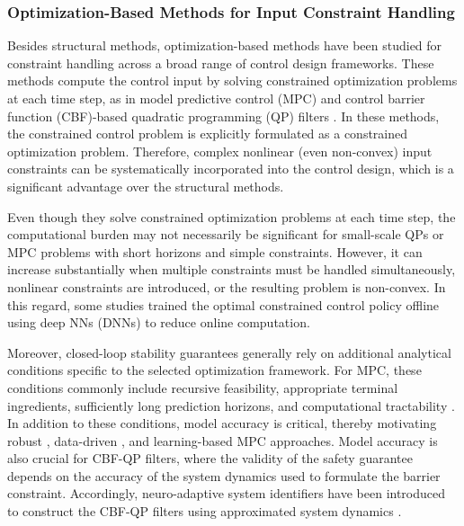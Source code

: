 \documentclass[letterpaper, journal]{IEEEtran}
\begin{document}


\subsubsection{Optimization-Based Methods for Input Constraint Handling}

Besides structural methods, optimization-based methods have been studied for constraint handling across a broad range of control design frameworks.
These methods compute the control input by solving constrained optimization problems at each time step, as in model predictive control (MPC) \cite{Vahidi-Moghaddam:2025aa,Mallick:2025aa,Khodaverdian:2025aa,Greune:2011aa,Bemporad:1999aa,Berberich:2025aa,Draeger:1995aa} and control barrier function (CBF)-based quadratic programming (QP) filters \cite{Ames:2019aa,Ko:2025aa,Sweatland:2025aa}. 
In these methods, the constrained control problem is explicitly formulated as a constrained optimization problem.
Therefore, complex nonlinear (even non-convex) input constraints can be systematically incorporated into the control design, which is a significant advantage over the structural methods.

Even though they solve constrained optimization problems at each time step, the computational burden may not necessarily be significant for small-scale QPs or MPC problems with short horizons and simple constraints.
However, it can increase substantially when multiple constraints must be handled simultaneously, nonlinear constraints are introduced, or the resulting problem is non-convex.
In this regard, some studies \cite{Vahidi-Moghaddam:2025aa,Mallick:2025aa,Khodaverdian:2025aa} trained the optimal constrained control policy offline using deep NNs (DNNs) to reduce online computation.

Moreover, closed-loop stability guarantees generally rely on additional analytical conditions specific to the selected optimization framework.
For MPC, these conditions commonly include recursive feasibility, appropriate terminal ingredients, sufficiently long prediction horizons, and computational tractability \cite{Greune:2011aa}.
In addition to these conditions, model accuracy is critical, thereby motivating robust \cite{Bemporad:1999aa}, data-driven \cite{Berberich:2025aa}, and learning-based MPC \cite{Draeger:1995aa,Vahidi-Moghaddam:2025aa} approaches.
Model accuracy is also crucial for CBF-QP filters, where the validity of the safety guarantee depends on the accuracy of the system dynamics used to formulate the barrier constraint.
Accordingly, neuro-adaptive system identifiers have been introduced to construct the CBF-QP filters using approximated system dynamics \cite{Sweatland:2025aa}.
\end{document}
